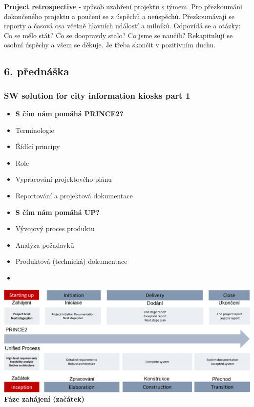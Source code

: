 \documentclass[11pt,a4paper]{article}
\begin{document}
        \textbf{Project retrospective} - způsob uzabření projektu s týmem. Pro přezkoumání dokončeného projektu a poučení se z úspěchů a neúspěchů. Přezkoumávají se reporty a časová osa včetně hlavních událostí a milníků. Odpovídá se a otázky: Co se mělo stát? Co se doopravdy stalo? Co jsme se naučili? Rekapitulují se osobní úspěchy a všem se děkuje. Je třeba skončit v pozitivním duchu.
    \subsection{6. přednáška}
    \subsubsection{SW solution for city information kiosks part 1 \cite{pres-6}}
        \begin{multicols}{2}
        \begin{itemize}
            \item \textbf{S čím nám pomáhá PRINCE2?}
            \item Terminologie
            \item Řídící principy
            \item Role
            \item Vypracování projektového plánu
            \item Reportování a projektová dokumentace
            \item \textbf{S čím nám pomáhá UP?}
            \item Vývojový proces produktu
            \item Analýza požadavků
            \item Produktová (technická) dokumentace
            \item
        \end{itemize}
        \end{multicols}
        \includegraphics[width=\textwidth]{PRINCE2UP.png}
        \textbf{Fáze zahájení (začátek)}\\
\end{document}
